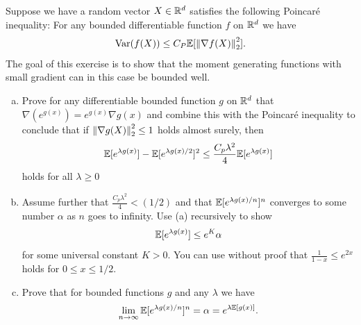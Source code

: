 \begin{myexercise}
    \label{prob:poincaremgf}
    Suppose we have a random vector $X \in \mathbb{R}^d$ satisfies the following Poincaré inequality: For any bounded differentiable function $f$ on $\mathbb{R}^d$ we have 
    $$ \operatorname{Var}(f(X)) \leq C_P \mathbb{E}[{\left\lVert{\nabla f(X)}\right\rVert}_2^2].$$
    The goal of this exercise is to show that the moment generating functions with small gradient can in this case be bounded well.
    \begin{enumerate}[(a)]
        \item Prove for any differentiable bounded function $g$ on $\mathbb{R}^d$ that $\nabla(e^{g(x)}) = e^{g(x)} \nabla g(x)$ and combine this with the Poincaré inequality to conclude that if ${\left\lVert{\nabla g(X)}\right\rVert}_2^2 \leq 1$ holds almost surely, then 
        $$ \mathbb{E}[e^{\lambda g(x)}]- \mathbb{E}[e^{\lambda g(x)/2}]^2 \leq \frac{C_p\lambda^2}{4} \mathbb{E}[e^{\lambda g(x)}]$$
        holds for all $\lambda \geq 0 $
        \item Assume further that $\frac{C_p\lambda^2}{4} <(1/2)$ and that $\mathbb{E}[e^{\lambda g(x)/n}]^n$ converges to some number $\alpha$ as $n$ goes to infinity. Use (a) recursively to show
        $$ \mathbb{E}[e^{\lambda g(x)}] \leq e^{K}\alpha$$
        for some universal constant $K>0$. You can use without proof that $\frac{1}{1-x}\leq e^{2x}$ holds for $0\leq x \leq 1/2$.
        \item Prove that for bounded functions $g$ and any $\lambda$ we have 
        $$ \lim_{n \to \infty } \mathbb{E}[e^{\lambda g(x)/n}]^n = \alpha = e^{\lambda \mathbb{E}[g(x)]}. $$
    \end{enumerate}
\end{myexercise}














